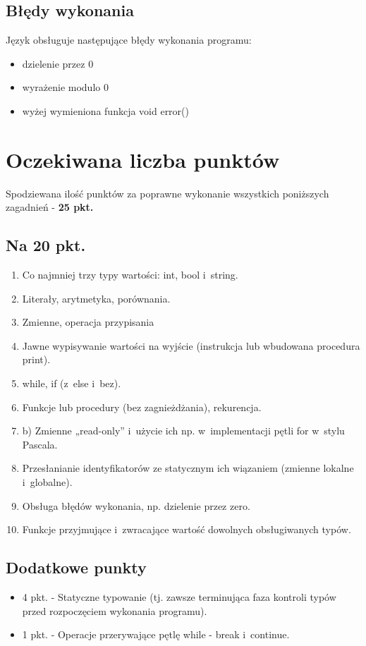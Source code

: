 \documentclass{article}
\begin{document}
\subsection{Błędy wykonania}
Język obsługuje następujące błędy wykonania programu:
\begin{itemize}
    \item dzielenie przez 0
    \item wyrażenie modulo 0
    \item wyżej wymieniona funkcja void error()
\end{itemize}

\newpage
\section{Oczekiwana liczba punktów}
Spodziewana ilość punktów za poprawne wykonanie wszystkich poniższych zagadnień - \textbf{25 pkt.}

\subsection{Na 20 pkt.}
\begin{enumerate}
    \item Co najmniej trzy typy wartości: int, bool i~string.
    \item Literały, arytmetyka, porównania.
    \item Zmienne, operacja przypisania
    \item Jawne wypisywanie wartości na wyjście (instrukcja lub wbudowana procedura print).
    \item while, if (z~else i~bez).
    \item Funkcje lub procedury (bez zagnieżdżania), rekurencja.
    \item b) Zmienne „read-only” i~użycie ich np. w~implementacji pętli for w~stylu Pascala.
    \item Przesłanianie identyfikatorów ze statycznym ich wiązaniem (zmienne lokalne i~globalne).
    \item Obsługa błędów wykonania, np. dzielenie przez zero.
    \item Funkcje przyjmujące i~zwracające wartość dowolnych obsługiwanych typów.
\end{enumerate}

\subsection{Dodatkowe punkty}
\begin{itemize}
    \item 4 pkt. - Statyczne typowanie (tj. zawsze terminująca faza 
    kontroli typów przed rozpoczęciem wykonania programu).
    \item 1 pkt. - Operacje przerywające pętlę while - break i~continue.
\end{itemize}
\end{document}
